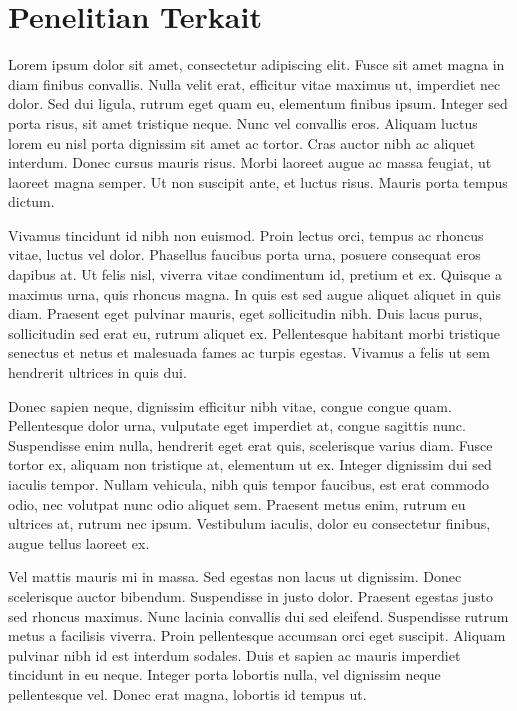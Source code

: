 \documentclass[conference,a4paper,10pt]{IEEEtran}
\begin{document}
\section{Penelitian Terkait}
Lorem ipsum dolor sit amet, consectetur adipiscing elit. Fusce sit amet magna
in diam finibus convallis. Nulla velit erat, efficitur vitae maximus ut,
imperdiet nec dolor. Sed dui ligula, rutrum eget quam eu, elementum finibus
ipsum. Integer sed porta risus, sit amet tristique neque. Nunc vel convallis
eros. Aliquam luctus lorem eu nisl porta dignissim sit amet ac tortor. Cras
auctor nibh ac aliquet interdum. Donec cursus mauris risus. Morbi laoreet augue
ac massa feugiat, ut laoreet magna semper. Ut non suscipit ante, et luctus
risus. Mauris porta tempus dictum.

Vivamus tincidunt id nibh non euismod. Proin lectus orci, tempus ac rhoncus
vitae, luctus vel dolor. Phasellus faucibus porta urna, posuere consequat eros
dapibus at. Ut felis nisl, viverra vitae condimentum id, pretium et ex. Quisque
a maximus urna, quis rhoncus magna. In quis est sed augue aliquet aliquet in
quis diam. Praesent eget pulvinar mauris, eget sollicitudin nibh. Duis lacus
purus, sollicitudin sed erat eu, rutrum aliquet ex. Pellentesque habitant morbi
tristique senectus et netus et malesuada fames ac turpis egestas. Vivamus a
felis ut sem hendrerit ultrices in quis dui.

Donec sapien neque, dignissim efficitur nibh vitae, congue congue quam.
Pellentesque dolor urna, vulputate eget imperdiet at, congue sagittis nunc.
Suspendisse enim nulla, hendrerit eget erat quis, scelerisque varius diam. Fusce
tortor ex, aliquam non tristique at, elementum ut ex. Integer dignissim dui sed
iaculis tempor. Nullam vehicula, nibh quis tempor faucibus, est erat commodo
odio, nec volutpat nunc odio aliquet sem. Praesent metus enim, rutrum eu
ultrices at, rutrum nec ipsum. Vestibulum iaculis, dolor eu consectetur
finibus, augue tellus laoreet ex.

Vel mattis mauris mi in massa. Sed egestas non lacus ut dignissim. Donec
scelerisque auctor bibendum. Suspendisse in justo dolor. Praesent egestas justo
sed rhoncus maximus. Nunc lacinia convallis dui sed eleifend. Suspendisse rutrum
metus a facilisis viverra. Proin pellentesque accumsan orci eget suscipit.
Aliquam pulvinar nibh id est interdum sodales. Duis et sapien ac mauris imperdiet
tincidunt in eu neque. Integer porta lobortis nulla, vel dignissim neque
pellentesque vel. Donec erat magna, lobortis id tempus ut.
\end{document}
